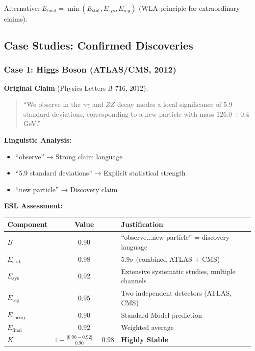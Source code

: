 \documentclass[11pt,a4paper]{article}
\begin{document}
Alternative: $E_{\text{final}} = \min(E_{\text{stat}}, E_{\text{sys}}, E_{\text{rep}})$ (WLA principle for extraordinary claims).

\subsection{Case Studies: Confirmed Discoveries}

\subsubsection{Case 1: Higgs Boson (ATLAS/CMS, 2012)}

\textbf{Original Claim} (Physics Letters B 716, 2012):
\begin{quote}
``We observe in the $\gamma\gamma$ and $ZZ$ decay modes a local significance of 5.9 standard deviations, corresponding to a new particle with mass $126.0 \pm 0.4$ GeV.''
\end{quote}

\textbf{Linguistic Analysis:}
\begin{itemize}
    \item ``observe'' → Strong claim language
    \item ``5.9 standard deviations'' → Explicit statistical strength
    \item ``new particle'' → Discovery claim
\end{itemize}

\textbf{ESL Assessment:}
\begin{center}
\begin{tabular}{lcl}
\toprule
\textbf{Component} & \textbf{Value} & \textbf{Justification} \\
\midrule
$B$ & 0.90 & ``observe...new particle'' = discovery language \\
$E_{\text{stat}}$ & 0.98 & $5.9\sigma$ (combined ATLAS + CMS) \\
$E_{\text{sys}}$ & 0.92 & Extensive systematic studies, multiple channels \\
$E_{\text{rep}}$ & 0.95 & Two independent detectors (ATLAS, CMS) \\
$E_{\text{theory}}$ & 0.90 & Standard Model prediction \\
\midrule
$E_{\text{final}}$ & 0.92 & Weighted average \\
\midrule
$K$ & $1 - \frac{|0.90 - 0.92|}{0.90} = 0.98$ & \textbf{Highly Stable} \\
\bottomrule
\end{tabular}
\end{center}
\end{document}
